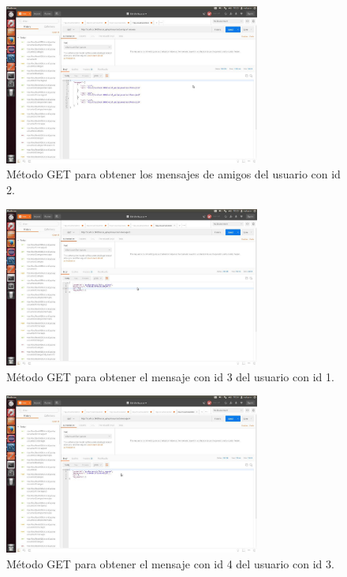 \documentclass[12pt,a4paper, spanish]{article}
\begin{document}
\begin{figure}[H]
	\centering
	\includegraphics[width=0.75\textwidth]{images/captura23.jpg}
	\caption{Método GET para obtener los mensajes de amigos del usuario con id 2.}
\end{figure}

\begin{figure}[H]
	\centering
	\includegraphics[width=0.75\textwidth]{images/captura24.jpg}
	\caption{Método GET para obtener el mensaje con id 3 del usuario con id 1.}
\end{figure}

\begin{figure}[H]
	\centering
	\includegraphics[width=0.75\textwidth]{images/captura25.jpg}
	\caption{Método GET para obtener el mensaje con id 4 del usuario con id 3.}
\end{figure}
\end{document}
